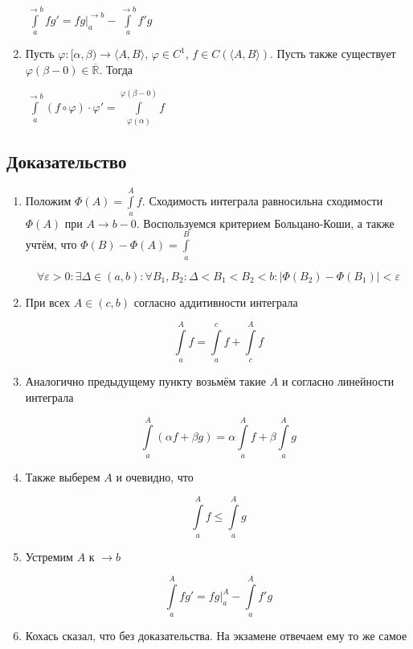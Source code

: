 \documentclass{article}
\begin{document}
\begin{enumerate}
                    $\int\limits^{\rightarrow b}_a f g' = fg \bigg|^{\rightarrow b}_a - \int\limits^{\rightarrow b}_a f'g$
                    
                \item Пусть $\varphi : [\alpha, \beta) \rightarrow \langle A, B \rangle$, $\varphi \in C^1$, $f \in C \left( \langle A, B \rangle \right)$. Пусть также существует $\varphi(\beta - 0) \in \overline{\mathbb{R}}$. Тогда
                
                    $\int\limits^{\rightarrow b}_a (f \circ \varphi) \cdot \varphi' = \int\limits^{\varphi(\beta - 0)}_{\varphi(\alpha)} f$
                    
            \end{enumerate}
        
        \subsection{Доказательство}
        
            \begin{enumerate}
            
                \item Положим $\Phi(A) = \int\limits^A_a f$. Сходимость интеграла равносильна сходимости $\Phi(A)$ при $A \rightarrow b - 0$. Воспользуемся критерием Больцано-Коши, а также учтём, что $\Phi(B) - \Phi(A) = \int\limits^B_a$
                
                $$\forall \varepsilon > 0 : \exists \Delta \in (a, b) : \forall B_1, B_2 : \Delta < B_1 < B_2 < b : \left| \Phi(B_2) - \Phi(B_1) \right| < \varepsilon$$
                
                \item При всех $A \in (c, b)$ согласно аддитивности интеграла
                
                    $$\int\limits^A_a f = \int\limits^c_a f + \int\limits^A_c f$$
                    
                \item Аналогично предыдущему пункту возьмём такие $A$ и согласно линейности интеграла
                
                    $$\int\limits^A_a (\alpha f + \beta g) = \alpha \int\limits^A_a f + \beta \int\limits^A_a g$$
                    
                \item Также выберем $A$ и очевидно, что
                
                    $$\int\limits^A_a f \leq \int\limits^A_a g$$
                    
                \item Устремим $A$ к $\rightarrow b$
                
                    $$\int\limits^A_a fg' = fg \bigg|^A_a - \int\limits^A_a f'g$$
                    
                \item Кохась сказал, что без доказательства. На экзамене отвечаем ему то же самое
                
            \end{enumerate}
    
\end{document}
